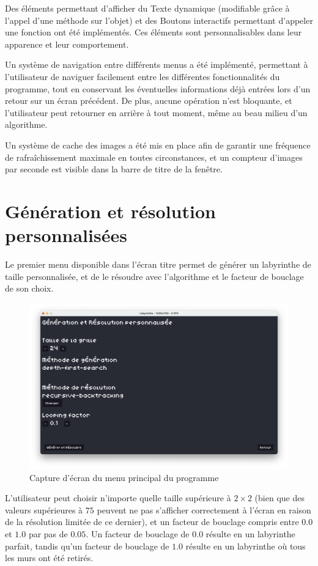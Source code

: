 \documentclass[12pt]{scrreprt} %
\begin{document}
Des éléments permettant d'afficher du Texte dynamique (modifiable grâce à l'appel d'une méthode sur l'objet) et des Boutons interactifs permettant d'appeler une fonction ont été implémentés. Ces éléments sont personnalisables dans leur apparence et leur comportement.

Un système de navigation entre différents menus a été implémenté, permettant à l'utilisateur de naviguer facilement entre les différentes fonctionnalités du programme, tout en conservant les éventuelles informations déjà entrées lors d'un retour sur un écran précédent. De plus, aucune opération n'est bloquante, et l'utilisateur peut retourner en arrière à tout moment, même au beau milieu d'un algorithme.

Un système de cache des images a été mis en place afin de garantir une fréquence de rafraîchissement maximale en toutes circonstances, et un compteur d'images par seconde est visible dans la barre de titre de la fenêtre.

\section{Génération et résolution personnalisées}

Le premier menu disponible dans l'écran titre permet de générer un labyrinthe de taille personnalisée, et de le résoudre avec l'algorithme et le facteur de bouclage de son choix.

\begin{figure}[h]
    \centering
    \includegraphics[width=\textwidth]{images/generationcustom.png}
    \caption{Capture d'écran du menu principal du programme}
\end{figure}

L'utilisateur peut choisir n'importe quelle taille supérieure à $2 \times 2$ (bien que des valeurs supérieures à $75$ peuvent ne pas s'afficher correctement à l'écran en raison de la résolution limitée de ce dernier), et un facteur de bouclage compris entre $0.0$ et $1.0$ par pas de $0.05$. Un facteur de bouclage de $0.0$ résulte en un labyrinthe parfait, tandis qu'un facteur de bouclage de $1.0$ résulte en un labyrinthe où tous les murs ont été retirés.
\end{document}
